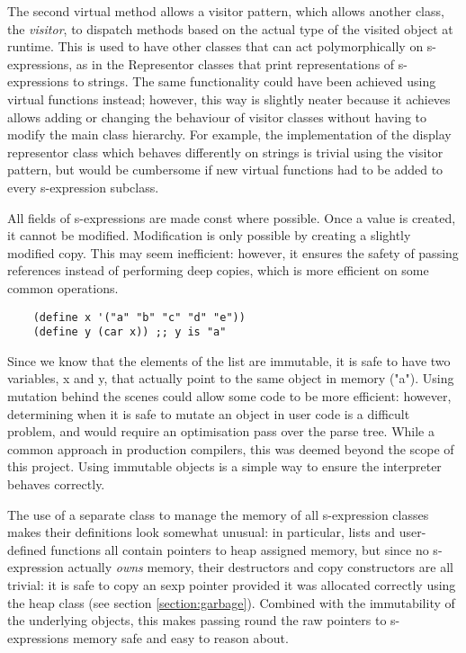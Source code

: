 \documentclass[12pt]{article}
\begin{document}
The second virtual method allows a visitor pattern, which allows
another class, the \textit{visitor}, to dispatch methods based on the
actual type of the visited object at runtime. This is used to have
other classes that can act polymorphically on s-expressions, as in the
Representor classes that print representations of s-expressions to
strings. The same functionality could have been achieved using virtual
functions instead; however, this way is slightly neater because it
achieves allows adding or changing the behaviour of visitor classes
without having to modify the main class hierarchy. For example, the
implementation of the display representor class which behaves
differently on strings is trivial using the visitor pattern, but would
be cumbersome if new virtual functions had to be added to every
s-expression subclass.



All fields of s-expressions are made const where possible. Once a
value is created, it cannot be modified. Modification is only possible
by creating a slightly modified copy. This may seem inefficient:
however, it ensures the safety of passing references instead of
performing deep copies, which is more efficient on some common operations.


\begin{lstlisting}
	(define x '("a" "b" "c" "d" "e"))
	(define y (car x)) ;; y is "a" 
\end{lstlisting}

Since we know that the elements of the list are immutable, it is safe
to have two variables, x and y, that actually point to the same object
in memory ("a"). Using mutation behind the scenes could allow some
code to be more efficient: however, determining when it is safe to
mutate an object in user code is a difficult problem, and would
require an optimisation pass over the parse tree. While
a common approach in production compilers, this was deemed beyond the
scope of this project. Using immutable objects is a simple way to ensure
the interpreter behaves correctly.

The use of a separate class to manage the memory of all s-expression
classes makes their definitions look somewhat unusual: in particular,
lists and user-defined functions all contain pointers to heap assigned
memory, but since no s-expression actually \textit{owns} memory, their
destructors and copy constructors are all trivial: it is safe to copy
an sexp pointer provided it was allocated correctly using the heap
class (see section \ref{section:garbage}). Combined with the
immutability of the underlying objects, this makes passing round the
raw pointers to s-expressions memory safe and easy to reason about.
\end{document}
